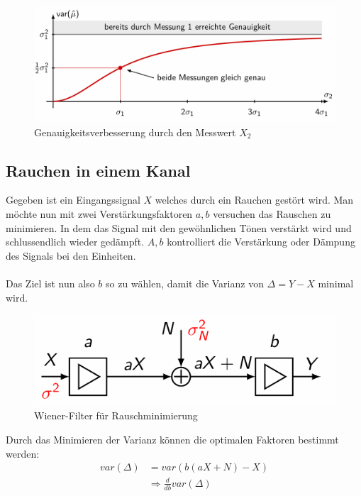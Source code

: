 \documentclass[../Main.tex]{subfiles}
\begin{document}
\begin{figure}[H]
    \centering
    \includegraphics[width=1\linewidth]{Images/verbesserung-genauigkeit-filter.png}
    \caption{Genauigkeitsverbesserung durch den Messwert \(X_2\)}
\end{figure}
\newpage

\subsection{Rauchen in einem Kanal}
Gegeben ist ein Eingangssignal \(X\) welches durch ein Rauchen gestört wird.
Man möchte nun mit zwei Verstärkungsfaktoren \(a,b\) versuchen das Rauschen zu minimieren.
In dem das Signal mit den gewöhnlichen Tönen verstärkt wird und schlussendlich wieder gedämpft.
\(A,b\) kontrolliert die Verstärkung oder Dämpung des Signals bei den Einheiten.
\\\\
Das Ziel ist nun also \(b\) so zu wählen, damit die Varianz von \(\Delta=Y-X\) minimal wird.

\begin{figure}[H]
    \centering
    \includegraphics[width=0.5\linewidth]{Images/wiener-filter.png}
    \caption{Wiener-Filter für Rauschminimierung}
\end{figure}

Durch das Minimieren der Varianz können die optimalen Faktoren bestimmt werden:
\begin{equation}
    \begin{split}
        var(\Delta) &= var(b(aX+N)-X)\\
        &\Rightarrow \frac{d}{db}var(\Delta)
    \end{split}
\end{equation}
\end{document}
